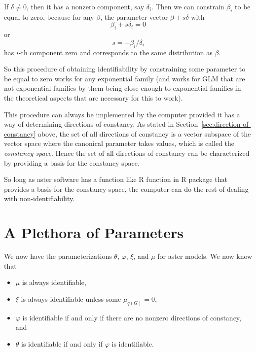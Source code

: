If $\delta \neq 0$, then it has a nonzero component, say $\delta_i$.
Then we can constrain $\beta_i$ to be equal to zero, because for any
$\beta$, the parameter vector $\beta + s \delta$ with
$$
   \beta_i + s \delta_i = 0
$$
or
$$
   s = - \beta_i / \delta_i
$$
has $i$-th component zero and corresponds to the same distribution as $\beta$.

So this procedure of obtaining identifiability by constraining some
parameter to be equal to zero works for any exponential family
(and works for GLM that are not exponential families by them being
close enough to exponential families in the theoretical aspects that
are necessary for this to work).

This procedure can always be implemented by the computer provided it has
a way of determining directions of constancy.
As stated in Section~\ref{sec:direction-of-constancy}
above, the set of all directions of constancy is a vector subspace of the
vector space where the canonical parameter takes values,
which is called the \emph{constancy space}.
Hence the set of all directions of constancy can be characterized by
providing a basis for the constancy space.

So long as aster software has a function like R function 
in R package  that provides a basis for the constancy space,
the computer can do the rest of dealing with non-identifiability.

\section{A Plethora of Parameters}
\label{sec:plethora}

We now have the parameterizations $\theta$, $\varphi$, $\xi$, and $\mu$
for aster models.  We now know that
\begin{itemize}
\item $\mu$ is always identifiable,
\item $\xi$ is always identifiable unless some $\mu_{q(G)} = 0$,
\item $\varphi$ is identifiable if and only if there are no nonzero
    directions of constancy, and
\item $\theta$ is identifiable if and only if $\varphi$ is identifiable.
\end{itemize}


